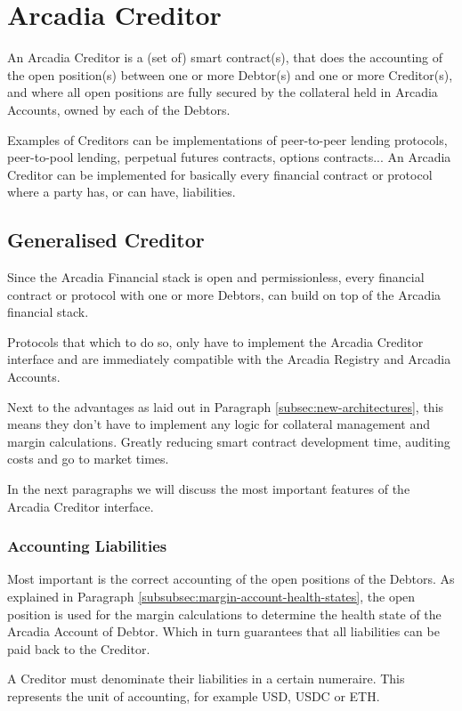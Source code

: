 \documentclass[sigconf,nonacm]{acmart}
\begin{document}
\section{Arcadia Creditor}
\label{sec:arcadia-creditor}
An Arcadia Creditor is a (set of) smart contract(s),
that does the accounting of the open position(s) between one or more Debtor(s) and one or more Creditor(s),
and where all open positions are fully secured by the collateral held in Arcadia Accounts,
owned by each of the Debtors.

Examples of Creditors can be implementations of peer-to-peer lending protocols, peer-to-pool lending, perpetual futures contracts, options contracts...
An Arcadia Creditor can be implemented for basically every financial contract or protocol where a party has, or can have, liabilities.

\subsection{Generalised Creditor}
Since the Arcadia Financial stack is open and permissionless,
every financial contract or protocol with one or more Debtors,
can build on top of the Arcadia financial stack.

Protocols that which to do so, only have to implement the Arcadia Creditor interface
and are immediately compatible with the Arcadia Registry and Arcadia Accounts.

Next to the advantages as laid out in Paragraph \ref{subsec:new-architectures},
this means they don't have to implement any logic for collateral management and margin calculations.
Greatly reducing smart contract development time, auditing costs and go to market times.

In the next paragraphs we will discuss the most important features of the Arcadia Creditor interface.

\subsubsection{Accounting Liabilities}
Most important is the correct accounting of the open positions of the Debtors.
As explained in Paragraph \ref{subsubsec:margin-account-health-states},
the open position is used for the margin calculations to determine the health state of the Arcadia Account of Debtor.
Which in turn guarantees that all liabilities can be paid back to the Creditor.

A Creditor must denominate their liabilities in a certain numeraire.
This represents the unit of accounting, for example USD, USDC or ETH.
\end{document}
